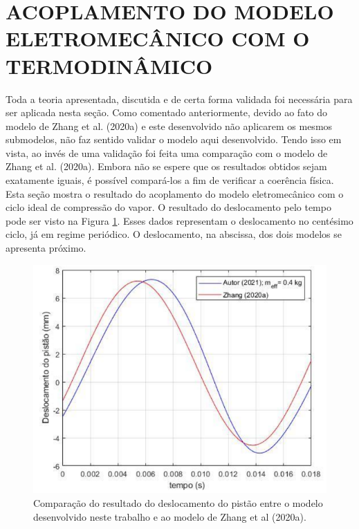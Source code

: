 \section{ACOPLAMENTO DO MODELO ELETROMECÂNICO COM O TERMODINÂMICO}

Toda a teoria apresentada, discutida e de certa forma validada foi necessária para ser aplicada nesta seção. Como comentado anteriormente, devido ao fato do modelo de Zhang et al. (2020a) e este desenvolvido não aplicarem os mesmos submodelos, não faz sentido validar o modelo aqui desenvolvido. Tendo isso em vista, ao invés de uma validação foi feita uma comparação com o modelo de Zhang et al. (2020a). Embora não se espere que os resultados obtidos sejam exatamente iguais, é possível compará-los a fim de verificar  a coerência física.
Esta seção mostra o resultado do acoplamento do modelo eletromecânico com o ciclo ideal de compressão do vapor. O resultado do deslocamento pelo tempo pode ser visto na Figura \ref{fig:comp_desloc}. Esses dados representam o deslocamento no centésimo ciclo, já em regime periódico. O deslocamento, na abscissa, dos dois modelos se apresenta próximo. 


 \begin{figure}[htb]
	\caption{\label{fig:comp_desloc}Comparação do resultado do deslocamento do pistão entre o modelo desenvolvido neste trabalho e ao modelo de Zhang et al (2020a).}
	\begin{center}
		\includegraphics[scale=0.60]{images/e_m_t.png}
	\end{center}
\end{figure}


